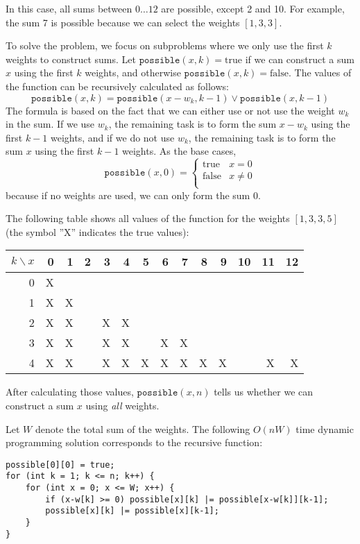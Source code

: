In this case, all sums between $0 \ldots 12$
are possible, except 2 and 10.
For example, the sum 7 is possible because we
can select the weights $[1,3,3]$.

To solve the problem, we focus on subproblems
where we only use the first $k$ weights
to construct sums.
Let $\texttt{possible}(x,k)=\textrm{true}$ if
we can construct a sum $x$
using the first $k$ weights,
and otherwise $\texttt{possible}(x,k)=\textrm{false}$.
The values of the function can be recursively
calculated as follows:
\[ \texttt{possible}(x,k) = \texttt{possible}(x-w_k,k-1) \lor \texttt{possible}(x,k-1) \]
The formula is based on the fact that we can
either use or not use the weight $w_k$ in the sum.
If we use $w_k$, the remaining task is to
form the sum $x-w_k$ using the first $k-1$ weights,
and if we do not use $w_k$,
the remaining task is to form the sum $x$
using the first $k-1$ weights.
As the base cases,
\begin{equation*}
    \texttt{possible}(x,0) = \begin{cases}
               \textrm{true}    & x = 0\\
               \textrm{false}   & x \neq 0 \\
           \end{cases}
\end{equation*}
because if no weights are used,
we can only form the sum 0.

The following table shows all values of the function
for the weights $[1,3,3,5]$ (the symbol ''X''
indicates the true values):

\begin{center}
\begin{tabular}{r|rrrrrrrrrrrrr}
$k \backslash x$ & 0 & 1 & 2 & 3 & 4 & 5 & 6 & 7 & 8 & 9 & 10 & 11 & 12 \\
\hline
 0 & X & \\
 1 & X & X \\
 2 & X & X & & X & X \\
 3 & X & X & & X & X & & X & X \\
 4 & X & X & & X & X & X & X & X & X & X & & X & X \\
\end{tabular}
\end{center}

After calculating those values, $\texttt{possible}(x,n)$
tells us whether we can construct a
sum $x$ using \emph{all} weights.

Let $W$ denote the total sum of the weights.
The following $O(nW)$ time
dynamic programming solution
corresponds to the recursive function:
\begin{lstlisting}
possible[0][0] = true;
for (int k = 1; k <= n; k++) {
    for (int x = 0; x <= W; x++) {
        if (x-w[k] >= 0) possible[x][k] |= possible[x-w[k]][k-1];
        possible[x][k] |= possible[x][k-1];
    }
}
\end{lstlisting}

